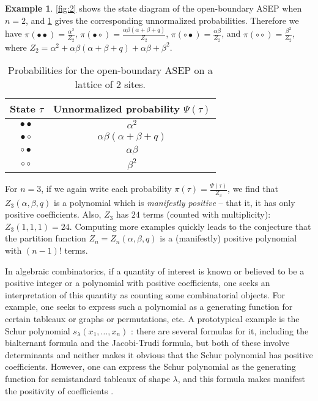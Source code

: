 \documentclass[11pt]{amsart}
\theoremstyle{definition}
\newtheorem{example}[theorem]{Example}
\theoremstyle{remark}
\begin{document}
\begin{example} \label{ex:1}
	\cref{fig:2}
	shows the state diagram of the open-boundary 
ASEP when $n=2$, %
	and \cref{table:1} gives the 
corresponding unnormalized probabilities.
Therefore we have 
$\pi(\bullet \bullet) = \frac{\alpha^2}{Z_2}$,
$\pi(\bullet \circ) = \frac{\alpha \beta(\alpha+\beta+q)}{Z_2}$, 
$\pi(\circ \bullet) = \frac{\alpha \beta}{Z_2}$, and 
$\pi(\circ \circ) = \frac{\beta^2}{Z_2}$, where
$Z_2 = \alpha^2+\alpha \beta(\alpha+\beta+q) + \alpha \beta + \beta^2$.
\end{example}
\begin{table}[h]
\begin{center}
\begin{tabular}{|c c| }
    \hline
	State $\tau$ & Unnormalized probability $\Psi(\tau)$\\
    \hline 
    $\bullet \bullet$ & $\alpha^2$\\
	$\bullet \circ$  & $\alpha \beta(\alpha+\beta+q)$\\
	$\circ \bullet$  & $\alpha \beta$\\
	$\circ \circ$ & $\beta^2$\\
    \hline
    \end{tabular}
\end{center}
	\caption{Probabilities for the open-boundary
	ASEP on a lattice of $2$ sites.}\label{table:1}
\end{table}

For $n=3$, 
if we again write 
each probability $\pi(\tau)=\frac{\Psi(\tau)}{Z_3}$,
we find that 
$Z_3(\alpha,\beta,q)$ is a polynomial which is 
\emph{manifestly positive} -- that it, it has 
 only positive coefficients.  Also, $Z_3$ has
$24$ terms (counted with multiplicity):  
$Z_3(1, 1, 1) = 24$.
Computing more examples quickly leads to the conjecture
that the {partition function}
$Z_n=Z_n(\alpha,\beta,q)$ is a (manifestly) positive polynomial with 
$(n-1)$! terms.

In algebraic combinatorics,  if a quantity of interest is known or believed
to be a positive integer or a polynomial with positive coefficients,  one seeks an 
interpretation of this quantity as counting some combinatorial objects.  For example,
one seeks to express such a polynomial as a generating function for certain
tableaux or graphs or permutations, etc. 
A prototypical example is the Schur polynomial $s_{\lambda}(x_1,\dots,x_n)$ \cite{EC2}: there are several
formulas for it, including the bialternant formula and the Jacobi-Trudi formula, but both of 
these involve determinants and neither 
 makes it obvious that the Schur polynomial has positive coefficients.  However, one can express 
the Schur polynomial as the generating function for semistandard tableaux of shape $\lambda$,
and this formula makes manifest the positivity of coefficients \cite{EC2}.
\end{document}
